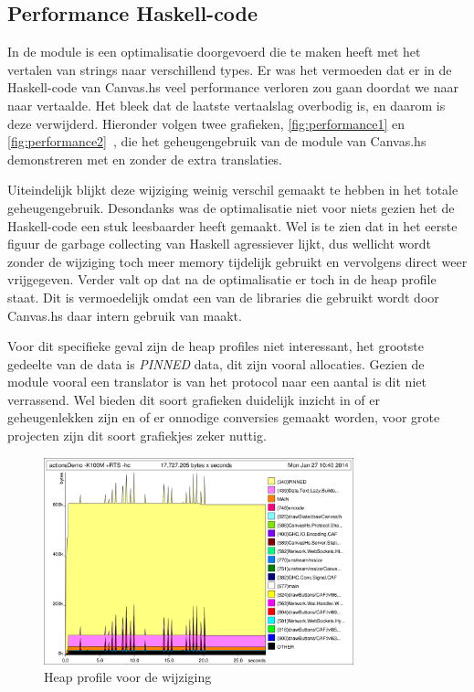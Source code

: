 \subsection{Performance Haskell-code}

In de module is een optimalisatie doorgevoerd die te maken heeft met het vertalen van strings naar verschillend types. Er was het vermoeden dat er in de Haskell-code van Canvas.hs veel performance verloren zou gaan doordat we  naar  naar  vertaalde. Het bleek dat de laatste vertaalslag overbodig is, en daarom is deze verwijderd. Hieronder volgen twee grafieken, \autoref{fig:performance1} en \autoref{fig:performance2}~, die het geheugengebruik van de module van Canvas.hs demonstreren met en zonder de extra translaties.

Uiteindelijk blijkt deze wijziging weinig verschil gemaakt te hebben in het totale geheugengebruik. Desondanks was de optimalisatie niet voor niets gezien het de Haskell-code een stuk leesbaarder heeft gemaakt. Wel is te zien dat in het eerste figuur de garbage collecting van Haskell agressiever lijkt, dus wellicht wordt zonder de wijziging toch meer memory tijdelijk gebruikt en vervolgens direct weer vrijgegeven. Verder valt op dat na de optimalisatie er toch  in de heap profile staat. Dit is vermoedelijk omdat een van de libraries die gebruikt wordt door Canvas.hs daar intern gebruik van maakt.

Voor dit specifieke geval zijn de heap profiles niet interessant, het grootste gedeelte van de data is \emph{PINNED} data, dit zijn vooral  allocaties. Gezien de module vooral een translator is van het protocol naar een aantal  is dit niet verrassend. Wel bieden dit soort grafieken duidelijk inzicht in of er geheugenlekken zijn en of er onnodige conversies gemaakt worden, voor grote projecten zijn dit soort grafiekjes zeker nuttig.

\begin{figure}[H]
\begin{center}
\includegraphics[keepaspectratio,width=0.8\textwidth]{./images/actionsDemoBeforeByteStrings.png}
\caption{Heap profile voor de wijziging}
\label{fig:performance1}
\end{center}
\end{figure}

